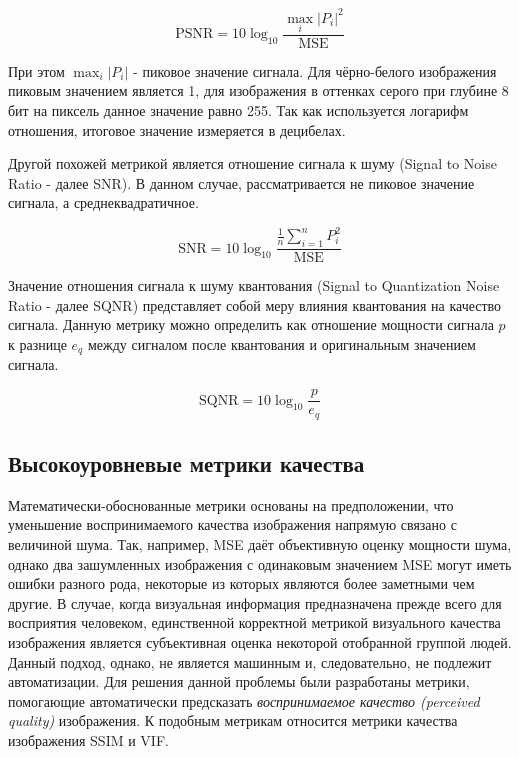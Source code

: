 \begin{equation} \label{eq:img_psnr}
    \text{PSNR} = 10\log_{10} \frac{\max_{i}\left|P_{i}\right|^{2}}{\text{MSE}}
\end{equation}

При этом $\max_{i}\left|P_{i}\right|$ - пиковое значение сигнала. Для
чёрно-белого изображения пиковым значением является 1, для изображения в
оттенках серого при глубине 8 бит на пиксель данное значение равно 255. Так как
используется логарифм отношения, итоговое значение измеряется в децибелах.


Другой похожей метрикой является отношение сигнала к шуму (Signal to Noise Ratio
- далее SNR). В данном случае, рассматривается не пиковое значение сигнала, а
среднеквадратичное.

\begin{equation} \label{eq:img_snr}
    \text{SNR} = 10\log_{10} \frac{\frac{1}{n}\sum_{i=1}^{n} P_{i}^{2}}{\text{MSE}}
\end{equation}

Значение отношения сигнала к шуму квантования (Signal to Quantization Noise
Ratio - далее SQNR) представляет собой меру влияния квантования на качество
сигнала. Данную метрику можно определить как отношение мощности сигнала $p$ к
разнице $e_{q}$ между сигналом после квантования и оригинальным значением
сигнала.

\begin{equation} \label{eq:img_sqnr}
    \text{SQNR} = 10\log_{10} \frac{p}{e_{q}}
\end{equation}

\subsection{Высокоуровневые метрики качества}


Математически-обоснованные метрики основаны на предположении, что уменьшение
воспринимаемого качества изображения напрямую связано с величиной шума. Так,
например, MSE даёт объективную оценку мощности шума, однако два зашумленных
изображения с одинаковым значением MSE могут иметь ошибки разного рода,
некоторые из которых являются более заметными чем другие. В случае, когда
визуальная информация предназначена прежде всего для восприятия человеком,
единственной корректной метрикой визуального качества изображения является
субъективная оценка некоторой отобранной группой людей\cite{SSIMArticle}. Данный
подход, однако, не является машинным и, следовательно, не подлежит
автоматизации. Для решения данной проблемы были разработаны метрики, помогающие
автоматически предсказать \textit{воспринимаемое качество (perceived quality)}
изображения. К подобным метрикам относится метрики качества изображения SSIM и
VIF.

